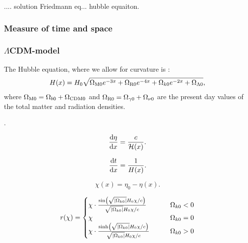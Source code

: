 .... solution Friedmann eq... hubble equaiton.  



\subsubsection{Measure of time and space}\label{sec:m1:measure_time_space}

\subsubsection{$\Lambda$CDM-model}












The Hubble equation, where we allow for curvature is :
\begin{equation}\label{eq:m1:hubble_equation}
    \begin{split}
        H(x) = H_0\sqrt{\Omega_\mathrm{M0}e^{-3x} + \Omega_\mathrm{R0}e^{-4x} + \Omega_{k0}e^{-2x} + \Omega_{\Lambda 0}},
    \end{split}
\end{equation}
where $\Omega_\mathrm{M0} = \Omega_{b0} + {\Omega_{\text{CDM}0}}$ and $\Omega_{\mathrm{R}0} = \Omega_{\gamma 0} + \Omega_{\nu 0}$ are the present day values of the total matter and radiation densities. 

.

\begin{equation}\label{eq:m1:eta_diff_eq}
    \dv{\eta}{x} = \frac{c}{\mathcal{H}(x)}.
\end{equation}

\begin{equation}\label{eq:m1:t_diff_eq}
    \dv{t}{x} = \frac{1}{H(x)}.
\end{equation}

\begin{equation}\label{eq:m1:co_moving_distance_def}
    \chi(x) = \eta_0 -\eta(x).
\end{equation}

\begin{equation}\label{eq:m1:r_equation_def}
    r(\chi) = \begin{cases}
        \chi \cdot \frac{\sin\left(\sqrt{\abs{\Omega_{k0}}}H_0\chi/c\right)}{\sqrt{\abs{\Omega_{k0}}}H_0\chi/c} \qquad &\Omega_{k0} < 0 \\
        \chi \qquad &\Omega_{k0} = 0 \\
        \chi \cdot \frac{\sinh\left(\sqrt{\abs{\Omega_{k0}}}H_0\chi/c\right)}{\sqrt{\abs{\Omega_{k0}}}H_0\chi/c} \qquad &\Omega_{k0} > 0
    \end{cases}
\end{equation}


